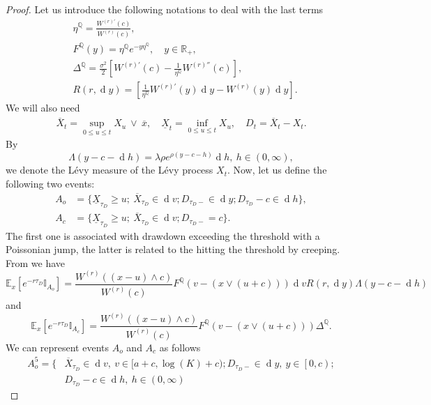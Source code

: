 \documentclass[10pt,a4paper]{amsart}
\def\E{{\mathbb{E}}}
\def\Q{{\mathbb{Q}}}
\def \R{{{\rm I{\!}\rm R}}}
\def \I{{\mathbb{I}}}
\newcommand{\dx}{\operatorname{d}\!}
\def\E{{\mathbb E}} \def\PP{\mc P} \def\Z{{\mathbb Z}} \def\R{{\mathbb R}}
\begin{document}
\begin{proof}
			
			Let us introduce the following notations to deal with the last terms
			\begin{align}
				&\eta^\Q = \frac{W^{(r)'}(c)}{W^{(r)}(c)}, \label{def_eta} \\
				\nonumber &F^\Q(y) = \eta^\Q e^{-y\eta^\Q},\quad y \in \mathbb{R}_+,  \\
				&\Delta^\Q = \frac{\sigma^2}{2}\left[ W^{(r)'}(c) - \frac{1}{\eta^{\Q}}W^{(r)''}(c) \right], \label{def_Delta} \\
				\nonumber &R(r,\dx y) = \left[\frac{1}{\eta^{\Q}} W^{(r)'}(y)\dx y - W^{(r)}(y)\dx y \right].
			\end{align}
			We will also need
			\begin{align*}
				\overline{X}_t =  \sup_{0 \leq u \leq t} X_u \ \vee\ \overline{x},  \quad
				\underline{X}_t =  \inf_{0 \leq u \leq t} X_u, \quad
				D_t = \overline{X}_t - X_t.
			\end{align*}
			By
			\begin{equation*}
				\Lambda(y-c-\dx h) = \lambda\rho e^{\rho(y-c-h)}\dx h, \ h \in (0, \infty),
			\end{equation*}
			we denote the L\'evy measure of the L\'evy process $X_t$.		
			Now, let us define the following two events:
			\begin{align*}
				A_o &= \{ \underline{X}_{\tau_D} \geq u;\ \overline{X}_{\tau_D} \in \dx v; D_{\tau_D-} \in \dx y; D_{\tau_D} - c \in \dx h \}, \\
				A_c &= \{ \underline{X}_{\tau_D} \geq u;\ \overline{X}_{\tau_D} \in \dx v; D_{\tau_D-} = c \}.
			\end{align*}
			The first one is associated with drawdown exceeding the threshold with a Poissonian jump, the latter is related to the hitting the threshold by creeping. From \cite[eq. (3.10, 3.11)]{MP} we have
			\begin{equation*}
				\E_x \left[ e^{-r\tau_D} \I_{A_o}\right] = \frac{W^{(r)} ((x-u)\wedge c)}{W^{(r)}(c)}F^\Q(v - (x\vee (u+c)))\dx v R(r,\dx y)	\Lambda(y-c-\dx h)
			\end{equation*}
and
			\begin{equation*}
				\E_x \left[ e^{-r\tau_D} \I_{A_c}\right] = \frac{W^{(r)} ((x-u)\wedge c)}{W^{(r)}(c)}F^\Q(v - (x\vee (u+c)))\Delta^\Q.
			\end{equation*}		
			We can represent events $A_o$ and $A_c$ as follows
			\begin{align*}
				A_o^5 = \{& \overline{X}_{\tau_D} \in \dx v,\ v \in [a+c, \log(K) +c); D_{\tau_D-} \in \dx y,\ y \in \left[ 0,c \right); \\ \nonumber & D_{\tau_D} - c \in \dx h,\ h \in (0, \infty)

\end{align*}
\end{proof}
\end{document}
